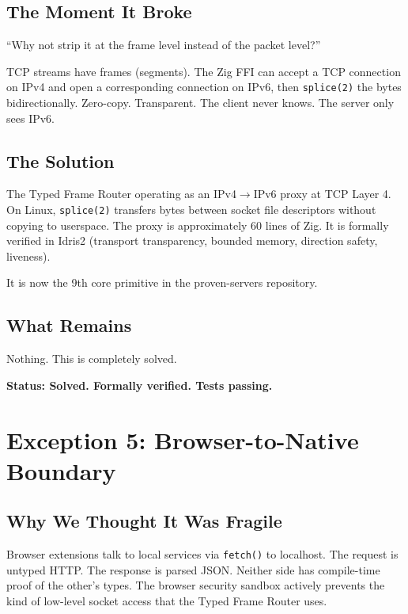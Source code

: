 \documentclass[11pt,a4paper]{article}
\begin{document}
\subsection{The Moment It Broke}

``Why not strip it at the frame level instead of the packet level?''

TCP streams have frames (segments). The Zig FFI can accept a TCP
connection on IPv4 and open a corresponding connection on IPv6, then
\texttt{splice(2)} the bytes bidirectionally. Zero-copy. Transparent.
The client never knows. The server only sees IPv6.

\subsection{The Solution}

The Typed Frame Router operating as an IPv4$\rightarrow$IPv6 proxy at
TCP Layer 4. On Linux, \texttt{splice(2)} transfers bytes between socket
file descriptors without copying to userspace. The proxy is approximately
60 lines of Zig. It is formally verified in Idris2 (transport
transparency, bounded memory, direction safety, liveness).

It is now the 9th core primitive in the proven-servers repository.

\subsection{What Remains}

Nothing. This is completely solved.

\textbf{Status: Solved. Formally verified. Tests passing.}

\section{Exception 5: Browser-to-Native Boundary}
\label{sec:browser}

\subsection{Why We Thought It Was Fragile}

Browser extensions talk to local services via \texttt{fetch()} to
localhost. The request is untyped HTTP. The response is parsed JSON.
Neither side has compile-time proof of the other's types. The browser
security sandbox actively prevents the kind of low-level socket access
that the Typed Frame Router uses.
\end{document}
